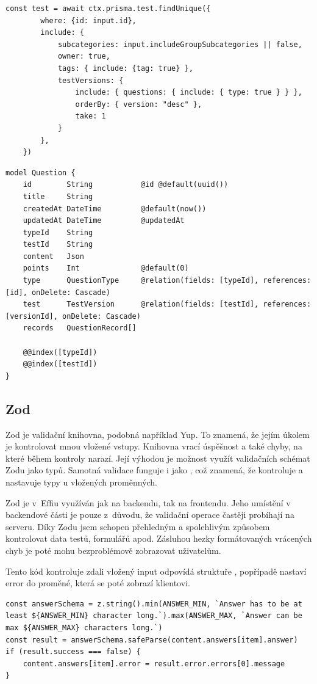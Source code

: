 \documentclass[12pt, a4paper,
openright
]{report}
\begin{document}
\begin{lstlisting}[style=ES6, caption=Získání testu podle id a přidání dat ze spojených tabulek, label=prisma_code_use]
	const test = await ctx.prisma.test.findUnique({
		where: {id: input.id},
		include: {
			subcategories: input.includeGroupSubcategories || false,
			owner: true,
			tags: {	include: {tag: true} },
			testVersions: {
				include: { questions: { include: { type: true } } },
				orderBy: { version: "desc" },
				take: 1
			}
		},
	})
\end{lstlisting}

\begin{lstlisting}[style=ES6, caption=Schéma modelu verze testu, label=prisma_code_schema]
model Question {
	id        String           @id @default(uuid())
	title     String
	createdAt DateTime         @default(now())
	updatedAt DateTime         @updatedAt
	typeId    String
	testId    String
	content   Json
	points    Int              @default(0)
	type      QuestionType     @relation(fields: [typeId], references: [id], onDelete: Cascade)
	test      TestVersion      @relation(fields: [testId], references: [versionId], onDelete: Cascade)
	records   QuestionRecord[]
	
	@@index([typeId])
	@@index([testId])
}
\end{lstlisting}

\subsection{Zod}
Zod je validační knihovna, podobná například Yup. To znamená, že jejím úkolem je kontrolovat mnou vložené vstupy. Knihovna vrací úspěšnost a také chyby, na které během kontroly narazí. Její výhodou je možnost využít validačních schémat Zodu jako typů. Samotná validace funguje i jako , což znamená, že kontroluje a nastavuje typy u vložených proměnných.

Zod je v~Effiu využíván jak na backendu, tak na frontendu. Jeho umístění v backendové části je pouze z~důvodu, že validační operace častěji probíhají na serveru. Díky Zodu jsem schopen přehledným a spolehlivým způsobem kontrolovat data testů, formulářů apod. Zásluhou hezky formátovaných vrácených chyb je poté mohu bezproblémově zobrazovat uživatelům.

Tento kód kontroluje zdali vložený input odpovídá struktuře , popřípadě nastaví error do proměné, která se poté zobrazí klientovi.

\begin{lstlisting}[style=ES6, caption=Validace vstupu pomocí validační knihovny Zod, label=zod]
const answerSchema = z.string().min(ANSWER_MIN, `Answer has to be at least ${ANSWER_MIN} character long.`).max(ANSWER_MAX, `Answer can be max ${ANSWER_MAX} characters long.`)
const result = answerSchema.safeParse(content.answers[item].answer)
if (result.success === false) {
	content.answers[item].error = result.error.errors[0].message
}
\end{lstlisting}
\end{document}
